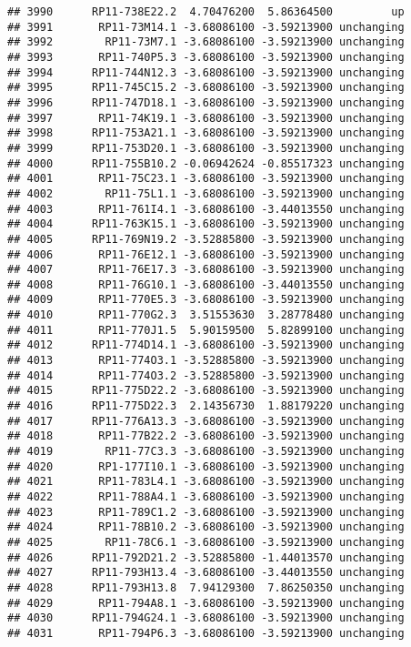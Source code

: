 \documentclass[]{article}
\begin{document}
\begin{verbatim}
## 3990      RP11-738E22.2  4.70476200  5.86364500         up
## 3991       RP11-73M14.1 -3.68086100 -3.59213900 unchanging
## 3992        RP11-73M7.1 -3.68086100 -3.59213900 unchanging
## 3993       RP11-740P5.3 -3.68086100 -3.59213900 unchanging
## 3994      RP11-744N12.3 -3.68086100 -3.59213900 unchanging
## 3995      RP11-745C15.2 -3.68086100 -3.59213900 unchanging
## 3996      RP11-747D18.1 -3.68086100 -3.59213900 unchanging
## 3997       RP11-74K19.1 -3.68086100 -3.59213900 unchanging
## 3998      RP11-753A21.1 -3.68086100 -3.59213900 unchanging
## 3999      RP11-753D20.1 -3.68086100 -3.59213900 unchanging
## 4000      RP11-755B10.2 -0.06942624 -0.85517323 unchanging
## 4001       RP11-75C23.1 -3.68086100 -3.59213900 unchanging
## 4002        RP11-75L1.1 -3.68086100 -3.59213900 unchanging
## 4003       RP11-761I4.1 -3.68086100 -3.44013550 unchanging
## 4004      RP11-763K15.1 -3.68086100 -3.59213900 unchanging
## 4005      RP11-769N19.2 -3.52885800 -3.59213900 unchanging
## 4006       RP11-76E12.1 -3.68086100 -3.59213900 unchanging
## 4007       RP11-76E17.3 -3.68086100 -3.59213900 unchanging
## 4008       RP11-76G10.1 -3.68086100 -3.44013550 unchanging
## 4009       RP11-770E5.3 -3.68086100 -3.59213900 unchanging
## 4010       RP11-770G2.3  3.51553630  3.28778480 unchanging
## 4011       RP11-770J1.5  5.90159500  5.82899100 unchanging
## 4012      RP11-774D14.1 -3.68086100 -3.59213900 unchanging
## 4013       RP11-774O3.1 -3.52885800 -3.59213900 unchanging
## 4014       RP11-774O3.2 -3.52885800 -3.59213900 unchanging
## 4015      RP11-775D22.2 -3.68086100 -3.59213900 unchanging
## 4016      RP11-775D22.3  2.14356730  1.88179220 unchanging
## 4017      RP11-776A13.3 -3.68086100 -3.59213900 unchanging
## 4018       RP11-77B22.2 -3.68086100 -3.59213900 unchanging
## 4019        RP11-77C3.3 -3.68086100 -3.59213900 unchanging
## 4020       RP1-177I10.1 -3.68086100 -3.59213900 unchanging
## 4021       RP11-783L4.1 -3.68086100 -3.59213900 unchanging
## 4022       RP11-788A4.1 -3.68086100 -3.59213900 unchanging
## 4023       RP11-789C1.2 -3.68086100 -3.59213900 unchanging
## 4024       RP11-78B10.2 -3.68086100 -3.59213900 unchanging
## 4025        RP11-78C6.1 -3.68086100 -3.59213900 unchanging
## 4026      RP11-792D21.2 -3.52885800 -1.44013570 unchanging
## 4027      RP11-793H13.4 -3.68086100 -3.44013550 unchanging
## 4028      RP11-793H13.8  7.94129300  7.86250350 unchanging
## 4029       RP11-794A8.1 -3.68086100 -3.59213900 unchanging
## 4030      RP11-794G24.1 -3.68086100 -3.59213900 unchanging
## 4031       RP11-794P6.3 -3.68086100 -3.59213900 unchanging

\end{verbatim}
\end{document}
